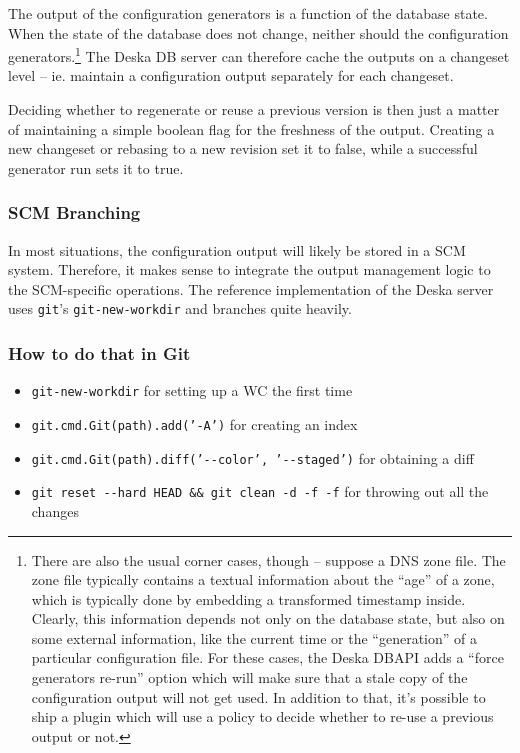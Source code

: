\documentclass[deska]{subfiles}
\begin{document}
The output of the configuration generators is a function of the database state.  When the state of the database does not
change, neither should the configuration generators.\footnote{There are also the usual corner cases, though -- suppose a
DNS zone file.  The zone file typically contains a textual information about the ``age'' of a zone, which is typically
done by embedding a transformed timestamp inside.  Clearly, this information depends not only on the database state, but
also on some external information, like the current time or the ``generation'' of a particular configuration file.  For
these cases, the Deska DBAPI adds a ``force generators re-run'' option which will make sure that a stale copy of the
configuration output will not get used.  In addition to that, it's possible to ship a plugin which will use a policy to
decide whether to re-use a previous output or not.}  The Deska DB server can therefore cache the outputs on a changeset
level -- ie. maintain a configuration output separately for each changeset.

Deciding whether to regenerate or reuse a previous version is then just a matter of maintaining a simple boolean flag
for the freshness of the output.  Creating a new changeset or rebasing to a new revision set it to false, while a
successful generator run sets it to true.

\subsubsection{SCM Branching}

In most situations, the configuration output will likely be stored in a SCM system.  Therefore, it makes sense to
integrate the output management logic to the SCM-specific operations.  The reference implementation of the Deska server
uses {\tt git}'s {\tt git-new-workdir} and branches quite heavily.

\subsubsection{How to do that in Git}

\begin{itemize}
    \item {\tt git-new-workdir} for setting up a WC the first time
    \item {\tt git.cmd.Git(path).add('-A')} for creating an index
    \item {\tt git.cmd.Git(path).diff('-{-}color', '-{-}staged')} for obtaining a diff
    \item {\tt git reset -{-}hard HEAD \&\& git clean -d -f -f} for throwing out all the changes
\end{itemize}
\end{document}
